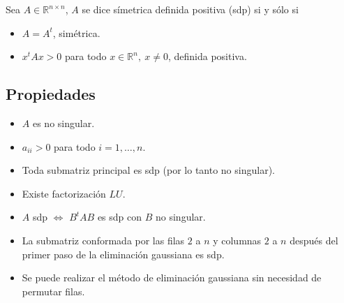 
Sea $A \in \mathbb{R}^{n \times n}$, $A$ se dice símetrica definida positiva (sdp) si y sólo si

\begin{itemize}
    \item $A = A^t$, simétrica.
    \item $x^{t}Ax > 0$ para todo $x \in \mathbb{R}^{n},~ x \neq 0$, definida positiva.
\end{itemize}

\subsection{Propiedades}\label{matrices_sdp_propiedades}

\begin{itemize}
    \item $A$ es no singular.
    \item $a_{ii} > 0$ para todo $i = 1,\ldots,n$.
    \item Toda submatriz principal es sdp (por lo tanto no singular).
    \item Existe factorización $LU$.
    \item $A$ sdp $\iff$ $B^{t}AB$ es sdp con $B$ no singular.
    \item La submatriz conformada por las filas $2$ a $n$ y columnas $2$ a $n$ después del primer paso de
    la eliminación gaussiana es sdp.
    \item Se puede realizar el método de eliminación gaussiana sin necesidad de permutar filas.
\end{itemize}